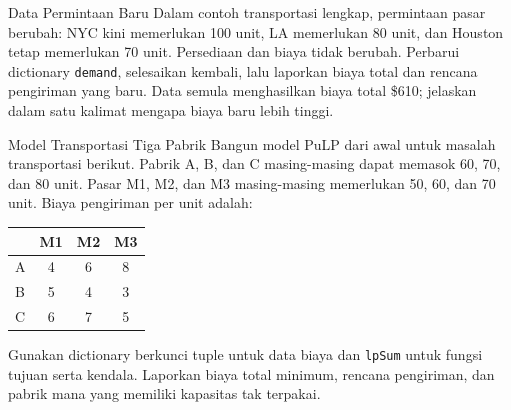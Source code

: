 \begin{ex}{Data Permintaan Baru}{}
\label{ex:pulp-transport-data}
Dalam contoh transportasi lengkap, permintaan pasar berubah: NYC kini memerlukan 100 unit, LA memerlukan 80 unit, dan Houston tetap memerlukan 70 unit. Persediaan dan biaya tidak berubah. Perbarui dictionary \texttt{demand}, selesaikan kembali, lalu laporkan biaya total dan rencana pengiriman yang baru. Data semula menghasilkan biaya total \$610; jelaskan dalam satu kalimat mengapa biaya baru lebih tinggi.
\end{ex}


\begin{ex}{Model Transportasi Tiga Pabrik}{}
\label{ex:pulp-transport-model}
Bangun model PuLP dari awal untuk masalah transportasi berikut. Pabrik A, B, dan C masing-masing dapat memasok 60, 70, dan 80 unit. Pasar M1, M2, dan M3 masing-masing memerlukan 50, 60, dan 70 unit. Biaya pengiriman per unit adalah:

\begin{center}
\begin{tabular}{l|ccc}
 & M1 & M2 & M3 \\
\hline
A & 4 & 6 & 8 \\
B & 5 & 4 & 3 \\
C & 6 & 7 & 5 \\
\end{tabular}
\par{}\label{tab:software-python-book1-tab02}%

\end{center}

Gunakan dictionary berkunci tuple untuk data biaya dan \texttt{lpSum} untuk fungsi tujuan serta kendala. Laporkan biaya total minimum, rencana pengiriman, dan pabrik mana yang memiliki kapasitas tak terpakai.
\end{ex}

